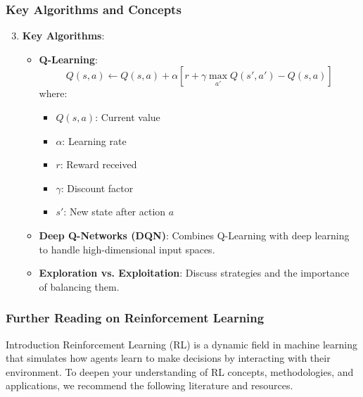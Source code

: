 \documentclass[aspectratio=169]{beamer}
\begin{document}
\begin{frame}[fragile]
    \frametitle{Key Algorithms and Concepts}
    \begin{enumerate}
        \setcounter{enumi}{2} %
        
        \item \textbf{Key Algorithms}:
        \begin{itemize}
            \item \textbf{Q-Learning}:
            \begin{equation}
                Q(s, a) \gets Q(s, a) + \alpha \left[ r + \gamma \max_{a'} Q(s', a') - Q(s, a) \right]
            \end{equation}
            where:
            \begin{itemize}
                \item \( Q(s, a) \): Current value
                \item \( \alpha \): Learning rate
                \item \( r \): Reward received
                \item \( \gamma \): Discount factor
                \item \( s' \): New state after action \( a \)
            \end{itemize}

            \item \textbf{Deep Q-Networks (DQN)}: Combines Q-Learning with deep learning to handle high-dimensional input spaces.
        
            \item \textbf{Exploration vs. Exploitation}: Discuss strategies and the importance of balancing them.
        \end{itemize}
    \end{enumerate}
\end{frame}

\begin{frame}[fragile]
    \frametitle{Further Reading on Reinforcement Learning}
    \begin{block}{Introduction}
        Reinforcement Learning (RL) is a dynamic field in machine learning that simulates how agents learn to make decisions by interacting with their environment. 
        To deepen your understanding of RL concepts, methodologies, and applications, we recommend the following literature and resources.
    \end{block}
\end{frame}
\end{document}
